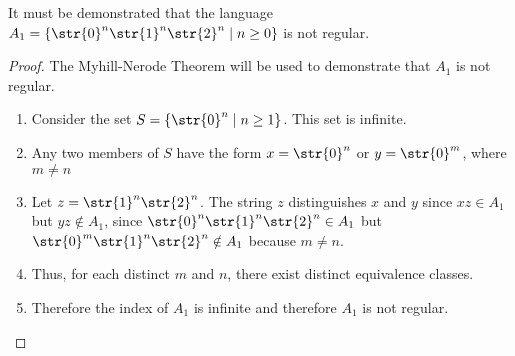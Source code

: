 It must be demonstrated that the language $A_1 = \{ \str{0}^n\str{1}^n\str{2}^n \mid n \geq 0 \}$ is not regular.
\begin{proof}
The Myhill-Nerode Theorem will be used to demonstrate that $A_1$ is not regular.
	\begin{enumerate}[label=\Roman*.]
		\item Consider the set $S = \{\str{0}^n \mid n \geq 1\}$. This set is infinite.
		\item Any two members of $S$ have the form $x = \str{0}^n$ or $y = \str{0}^m$, where $m \neq n$
		\item Let $z = \str{1}^n\str{2}^n$. The string $z$ distinguishes $x$ and $y$ since $xz \in A_1$ but $yz \notin A_1$, since $\str{0}^n\str{1}^n\str{2}^n \in A_1$ but $\str{0}^m\str{1}^n\str{2}^n \notin A_1$ because $m \neq n$.
		\item Thus, for each distinct $m$ and $n$, there exist distinct equivalence classes.
		\item Therefore the index of $A_1$ is infinite and therefore $A_1$ is not regular.
	\end{enumerate}
\end{proof}